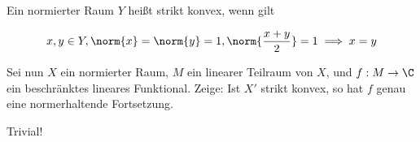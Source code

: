 \begin{exercise}

Ein normierter Raum $Y$ heißt strikt konvex, wenn gilt

\begin{align*}
  x, y \in Y,
  \norm{x} = \norm{y} = 1,
  \norm{\frac{x+y}{2}} = 1
  \implies
  x = y
\end{align*}

Sei nun $X$ ein normierter Raum, $M$ ein linearer Teilraum von $X$, und $f: M \to \C$ ein beschränktes lineares Funktional.
Zeige:
Ist $X\prime$ strikt konvex, so hat $f$ genau eine normerhaltende Fortsetzung.

\end{exercise}

\begin{solution}

Trivial!

\end{solution}
